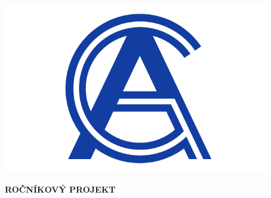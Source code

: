 

\pagestyle{empty}
\hypersetup{pageanchor=false}

\begin{center}

{\LARGE\bfseries\NazevSkoly}

\vspace{-22mm}
\vfill

{\LARGE\NazevOboru}

\vfill

\centerline{\mbox{\includegraphics[width=116mm]{../img/logo-ga.png}}}

\vspace{-8mm}
\vfill

{\bf\Large ROČNÍKOVÝ PROJEKT}

\vfill

{\Large \AutorPrace}

\vspace{15mm}

{\LARGE\bfseries\NazevPrace}




\vfill

\MesicOdevzdani \ \RokOdevzdani

\end{center}

\newpage


